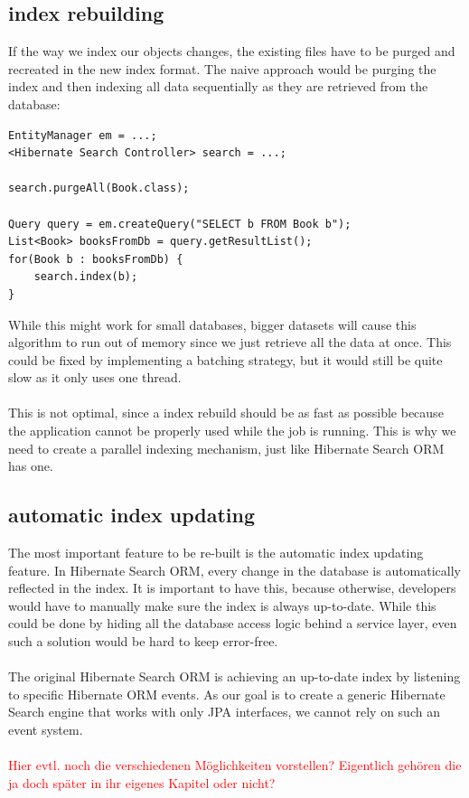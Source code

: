 \subsection{index rebuilding}
If the way we index our objects changes, the existing files have to be purged and recreated in the new index format. The naive approach would be purging the index and then indexing all data sequentially as they are retrieved from the database:
\\
\lstset{language=java}
\begin{lstlisting}[frame=htrbl, caption={naive index rebuilding}, label={lst:naiveIndexing}]
EntityManager em = ...;
<Hibernate Search Controller> search = ...;

search.purgeAll(Book.class);

Query query = em.createQuery("SELECT b FROM Book b");
List<Book> booksFromDb = query.getResultList();
for(Book b : booksFromDb) {
	search.index(b);
}
\end{lstlisting}
While this might work for small databases, bigger datasets will cause this algorithm to run out of memory since we just retrieve all the data at once. This could be fixed by implementing a batching strategy, but it would still be quite slow as it only uses one thread.
\\\\
This is not optimal, since a index rebuild should be as fast as possible because the application cannot be properly used while the job is running. This is why we need to create a parallel indexing mechanism, just like Hibernate Search ORM has one.

\subsection{automatic index updating}
The most important feature to be re-built is the automatic index updating feature. In Hibernate Search ORM, every change in the database is automatically reflected in the index. It is important to have this, because otherwise,
developers would have to manually make sure the index is always up-to-date. While this could be done by hiding all the database access logic behind a service layer, even such a solution would be hard to keep error-free.
\\\\
The original Hibernate Search ORM is achieving an up-to-date index by listening to specific Hibernate ORM events. As our goal is to create a generic Hibernate Search engine that works with only JPA interfaces, we cannot rely on such an event system.
\\\\
\textcolor{red}{Hier evtl. noch die verschiedenen Möglichkeiten vorstellen? Eigentlich gehören die ja doch später in ihr eigenes Kapitel oder nicht?}

\pagebreak